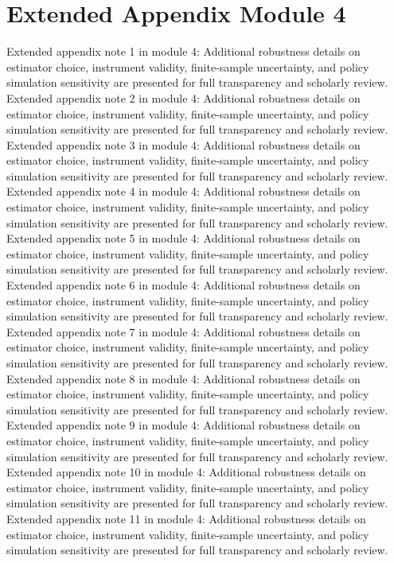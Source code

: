 \documentclass[preprint,12pt]{elsarticle}
\begin{document}
\section{Extended Appendix Module 4}
Extended appendix note 1 in module 4: Additional robustness details on estimator choice, instrument validity, finite-sample uncertainty, and policy simulation sensitivity are presented for full transparency and scholarly review.
Extended appendix note 2 in module 4: Additional robustness details on estimator choice, instrument validity, finite-sample uncertainty, and policy simulation sensitivity are presented for full transparency and scholarly review.
Extended appendix note 3 in module 4: Additional robustness details on estimator choice, instrument validity, finite-sample uncertainty, and policy simulation sensitivity are presented for full transparency and scholarly review.
Extended appendix note 4 in module 4: Additional robustness details on estimator choice, instrument validity, finite-sample uncertainty, and policy simulation sensitivity are presented for full transparency and scholarly review.
Extended appendix note 5 in module 4: Additional robustness details on estimator choice, instrument validity, finite-sample uncertainty, and policy simulation sensitivity are presented for full transparency and scholarly review.
Extended appendix note 6 in module 4: Additional robustness details on estimator choice, instrument validity, finite-sample uncertainty, and policy simulation sensitivity are presented for full transparency and scholarly review.
Extended appendix note 7 in module 4: Additional robustness details on estimator choice, instrument validity, finite-sample uncertainty, and policy simulation sensitivity are presented for full transparency and scholarly review.
Extended appendix note 8 in module 4: Additional robustness details on estimator choice, instrument validity, finite-sample uncertainty, and policy simulation sensitivity are presented for full transparency and scholarly review.
Extended appendix note 9 in module 4: Additional robustness details on estimator choice, instrument validity, finite-sample uncertainty, and policy simulation sensitivity are presented for full transparency and scholarly review.
Extended appendix note 10 in module 4: Additional robustness details on estimator choice, instrument validity, finite-sample uncertainty, and policy simulation sensitivity are presented for full transparency and scholarly review.
Extended appendix note 11 in module 4: Additional robustness details on estimator choice, instrument validity, finite-sample uncertainty, and policy simulation sensitivity are presented for full transparency and scholarly review.
\end{document}
